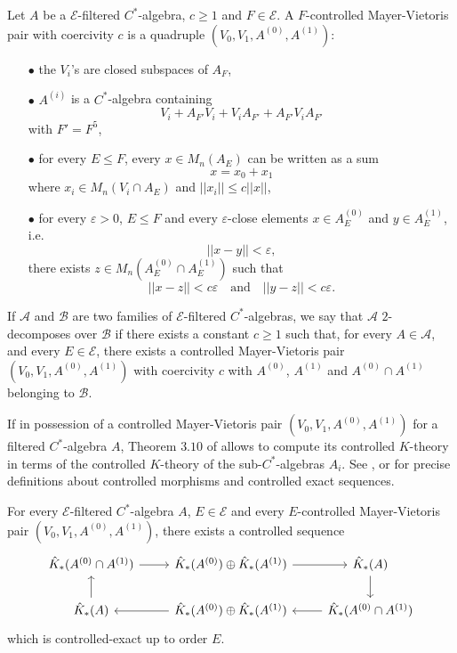 \begin{definition}
Let $A$ be a $\mathcal E$-filtered $C^*$-algebra, $c\geq 1$ and $F\in \mathcal E$. A $F$-controlled Mayer-Vietoris pair with coercivity $c$ is a quadruple $(V_0, V_1, A^{(0)}, A^{(1)})$:
\begin{itemize}
\item[$\bullet$] the $V_i$'s are closed subspaces of $A_F$,
\item[$\bullet$] $A^{(i)}$ is a $C^*$-algebra containing \[ V_i + A_{F'} V_i + V_i A_{F'}  + A_{F'} V_i A_{F'}\]
with $F' = F^5$,
\item[$\bullet$] for every $E\leq F$, every $x\in M_n(A_E)$ can be written as a sum \[x=x_0+x_1\] where $x_i\in M_n(V_i \cap A_E)$ and $|| x_i|| \leq c||x||$,
\item[$\bullet$] for every $\varepsilon>0$, $E\leq F$ and every $\varepsilon$-close elements $x\in A_E^{(0)}$ and $y\in A_E^{(1)}$, i.e.
\[|| x-y || < \varepsilon,\]
there exists $z\in M_n( A_E^{(0)}\cap A_E^{(1)})$ such that \[ ||x-z|| < c\varepsilon \quad \text{and} \quad ||y-z|| < c\varepsilon .\]
\end{itemize}
If $\mathcal A$ and $\mathcal B$ are two families of $\mathcal E$-filtered $C^*$-algebras, we say that $\mathcal A$ $2$-decomposes over $\mathcal B$ if there exists a constant $c\geq 1$ such that, for every $A\in\mathcal A$, and every $E\in \mathcal E$, there exists a controlled Mayer-Vietoris pair $(V_0, V_1, A^{(0)}, A^{(1)})$ with coercivity $c$ with $A^{(0)}$, $A^{(1)}$ and $A^{(0)} \cap A^{(1)}$ belonging to $\mathcal B$.
\end{definition} 

If in possession of a controlled Mayer-Vietoris pair $(V_0, V_1, A^{(0)}, A^{(1)})$ for a filtered $C^*$-algebra $A$, Theorem $3.10$ of \cite{OY4} allows to compute its controlled $K$-theory in terms of the controlled $K$-theory of the sub-$C^*$-algebras $A_i$. See \cite{OY4},\cite{DellAieraThesis} or \cite{dell2017controlled} for precise definitions about controlled morphisms and controlled exact sequences. 

\begin{thm}
For every $\mathcal E$-filtered $C^*$-algebra $A$, $E\in \mathcal E$ and every $E$-controlled Mayer-Vietoris pair $(V_0, V_1, A^{(0)}, A^{(1)})$, there exists a controlled sequence
\[\begin{tikzcd}
 \hat K_*( A^{(0)}\cap A^{(1)} ) \arrow{r} & \hat K_*(A^{(0)}) \oplus \hat K_*(A^{(1)}) \arrow{r} & \hat K_*(A) \arrow{d} \\ 
 \hat K_*(A) \arrow{u} & \hat K_*(A^{(0)}) \oplus \hat K_*(A^{(1)}) \arrow{l} & \hat K_*( A^{(0)}\cap A^{(1)} ) \arrow{l}
\end{tikzcd}\]
which is controlled-exact up to order $E$.  
\end{thm}  

